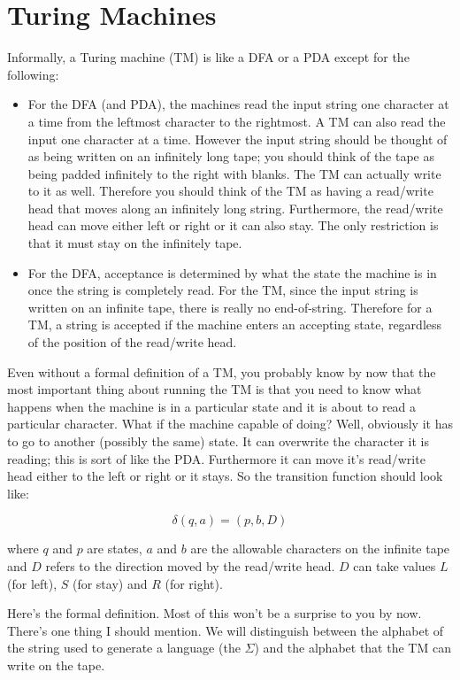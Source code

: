 \section{Turing Machines}

Informally, a Turing machine (TM) is like a DFA or a PDA except for
the following:
\begin{itemize}
\item For the DFA (and PDA), the machines read the input string one
 character at a time from the leftmost character to the rightmost. A
 TM can also read the input one character at a time. However
 the input string should be thought of as being written on an
 infinitely long tape; you should think of the tape as being padded
 infinitely to the right with blanks. The TM can actually write to it
 as well. Therefore you should think of the TM as having a read/write
 head that moves along an infinitely long string.
 Furthermore, the read/write head can move either
 left or right or it can also stay. The only restriction is that it
 must stay on the infinitely tape.
\item For the DFA, acceptance is
 determined by what the state the machine is in once the string is
 completely read. For the TM, since the input string is written on an
 infinite tape, there is really no end-of-string. Therefore for a TM, a string is
 accepted if the machine enters an accepting state, regardless of the
 position of the read/write head.
\end{itemize}

Even without a formal definition of a TM, you probably know by now
that the most important thing about running the TM is that you need
to know what happens when the machine is in a particular state and
it is about to read a particular character. What if the machine
capable of doing? Well, obviously it has to go to another (possibly
the same) state. It can overwrite the character it is reading; this
is sort of like the PDA. Furthermore it can move it's read/write
head either to the left or right or it stays. So the transition
function should look like:

\[\delta(q, a) = (p, b, D)\]

where $q$ and $p$ are states, $a$ and $b$ are the allowable
characters on the infinite tape and $D$ refers to the direction
moved by the read/write head. $D$ can take values $L$ (for left),
$S$ (for stay) and $R$ (for right).

Here's the formal definition. Most of this won't be a surprise to
you by now. There's one thing I should mention. We will distinguish
between the alphabet of the string used to generate a language (the
$\Sigma$) and the alphabet that the TM can write on the tape.

